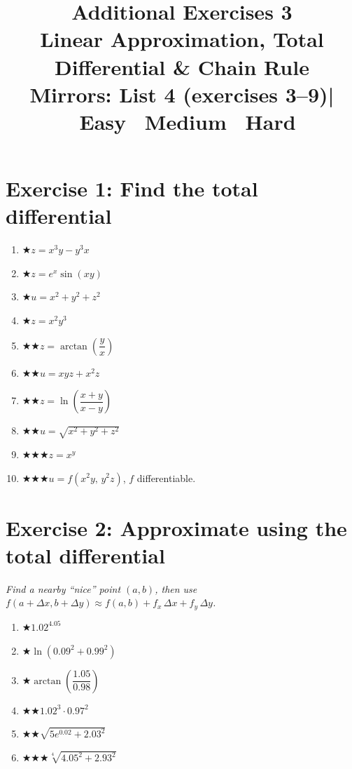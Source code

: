 \documentclass[12pt,a4paper]{article}
\title{\textbf{Additional Exercises 3}\\
\large Linear Approximation, Total Differential \& Chain Rule\\[4pt]
\normalsize Mirrors: List 4 (exercises 3--9)\quad|\quad
\easy\ Easy \quad \medium\ Medium \quad \hard\ Hard}
\date{}
\newcommand{\easy}{{\color{green!60!black}$\bigstar$}}
\newcommand{\medium}{{\color{orange}$\bigstar\bigstar$}}
\newcommand{\hard}{{\color{red}$\bigstar\bigstar\bigstar$}}
\begin{document}
\maketitle
\thispagestyle{empty}

\section*{Exercise 1: Find the total differential}

\begin{enumerate}[leftmargin=*, label=(\alph*)]
\item \easy\quad $z = x^3 y - y^3 x$
\item \easy\quad $z = e^x\sin(xy)$
\item \easy\quad $u = x^2 + y^2 + z^2$
\item \easy\quad $z = x^2 y^3$
\item \medium\quad $z = \arctan\!\left(\dfrac{y}{x}\right)$
\item \medium\quad $u = xyz + x^2 z$
\item \medium\quad $z = \ln\!\left(\dfrac{x+y}{x-y}\right)$
\item \medium\quad $u = \sqrt{x^2 + y^2 + z^2}$
\item \hard\quad $z = x^y$
\item \hard\quad $u = f(x^2 y,\, y^2 z)$, $f$ differentiable.
\end{enumerate}

\section*{Exercise 2: Approximate using the total differential}

\emph{Find a nearby ``nice'' point $(a,b)$, then use
$f(a+\Delta x,b+\Delta y)\approx f(a,b)+f_x\,\Delta x+f_y\,\Delta y$.}

\begin{enumerate}[leftmargin=*, label=(\alph*)]
\item \easy\quad $1.02^{4.05}$
\item \easy\quad $\ln(0.09^2+0.99^2)$
\item \easy\quad $\arctan\!\left(\dfrac{1.05}{0.98}\right)$
\item \medium\quad $1.02^3\cdot 0.97^2$
\item \medium\quad $\sqrt{5e^{0.02}+2.03^2}$
\item \hard\quad $\sqrt[4]{4.05^2+2.93^2}$
\end{enumerate}
\end{document}
